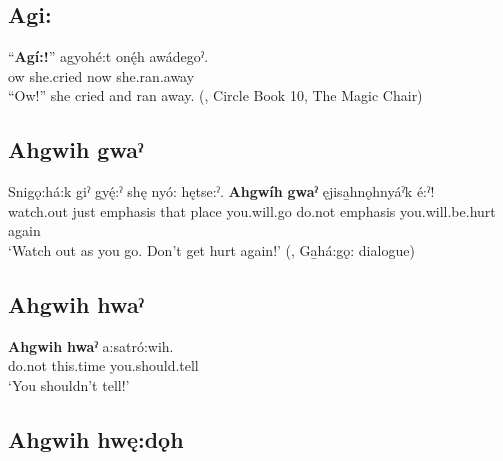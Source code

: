 \subsection*{\textbf{Agi:} } \label{p:[agi:]}

\ea
\label{ex:apart17}
\gll “\textbf{Agí:!}” agyohé:t onę́h awádegoˀ.\\
ow she.cried now she.ran.away\\
\glt “Ow!” she cried and ran away. (\cite{keye_circle_2016}, Circle Book 10, The Magic Chair)
\z


\subsection*{\textbf{Ahgwih gwaˀ} } \label{p:[ahgwih gwaˀ]}

\ea
\label{ex:apart2}
\gll Snigǫ:há:k giˀ gyę́:ˀ shę nyó: hętse:ˀ. \textbf{ Ahgwíh} \textbf{gwaˀ} ęjisa̱hnǫhnyáˀk é:ˀ!\\
watch.out just emphasis that place you.will.go do.not emphasis you.will.be.hurt again\\
\glt ‘Watch out as you go. Don’t get hurt again!’ (\cite[386]{mithun_watewayestanih_1984}, Ga̱há:gǫ: dialogue)
\z


\subsection*{\textbf{Ahgwih hwaˀ} } \label{p:[ahgwih hwaˀ]}

\ea
\label{ex:apart4}
\gll \textbf{Ahgwih} \textbf{hwaˀ} a:satró:wih.\\
do.not this.time you.should.tell\\
\glt ‘You shouldn’t tell!’
\z


\subsection*{\textbf{Ahgwih hwę:dǫh} } \label{p:[ahgwih hwę:dǫh]}

